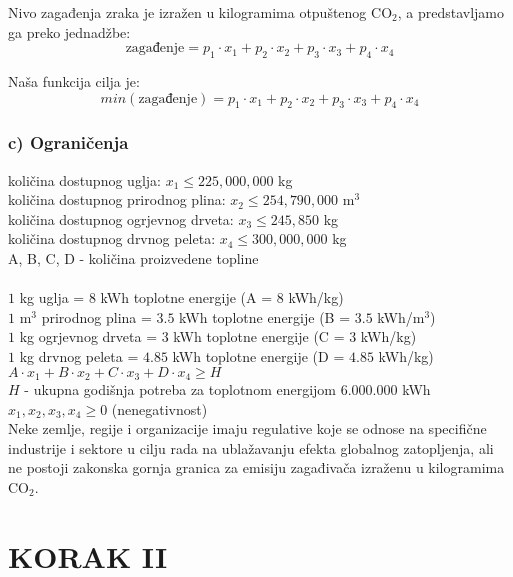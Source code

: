\documentclass[12pt, a4paper]{paper}
\begin{document}
Nivo zagađenja zraka je izražen u kilogramima otpuštenog CO$_2$, a predstavljamo ga preko jednadžbe:
\[ \text{zagađenje} = p_1 \cdot x_1 + p_2 \cdot x_2 + p_3 \cdot x_3 + p_4 \cdot x_4 \]

Naša funkcija cilja je:
\[ min(\text{zagađenje}) = p_1 \cdot x_1 + p_2 \cdot x_2 + p_3 \cdot x_3 + p_4 \cdot x_4 \]

\subsubsection*{c) Ograničenja}

količina dostupnog uglja: $x_1 \leq 225,000,000$ kg \\
količina dostupnog prirodnog plina: $x_2 \leq 254,790,000$ m$^3$ \\
količina dostupnog ogrjevnog drveta: $x_3 \leq 245,850$ kg \\
količina dostupnog drvnog peleta: $x_4 \leq 300,000,000$ kg \\

A, B, C, D - količina proizvedene topline
\\\\
$1$ kg uglja = $8$ kWh toplotne energije (A = $8$ kWh/kg) \\
$1$ m$^3$ prirodnog plina = $3.5$ kWh toplotne energije (B = $3.5$ kWh/m$^3$) \\
$1$ kg ogrjevnog drveta = $3$ kWh toplotne energije (C = $3$ kWh/kg) \\
$1$ kg drvnog peleta = $4.85$ kWh toplotne energije (D = $4.85$ kWh/kg) \\

$A \cdot x_1 + B \cdot x_2 + C \cdot x_3 + D \cdot x_4 \geq H$ \\
$H$ - ukupna godišnja potreba za toplotnom energijom $6.000.000$ kWh\\

$x_1, x_2, x_3, x_4 \geq 0$ (nenegativnost) \\

Neke zemlje, regije i organizacije imaju regulative koje se odnose na specifične industrije i sektore u cilju rada na ublažavanju efekta globalnog zatopljenja, ali ne postoji zakonska gornja granica za emisiju zagađivača izraženu u kilogramima CO$_2$.

\newpage
\section*{KORAK II}
\end{document}
